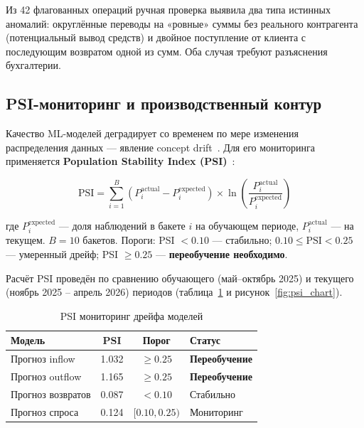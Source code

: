 Из 42 флагованных операций ручная проверка выявила два типа истинных аномалий: округлённые переводы на «ровные» суммы без реального контрагента (потенциальный вывод средств) и двойное поступление от клиента с последующим возвратом одной из сумм. Оба случая требуют разъяснения бухгалтерии.

\subsection{PSI-мониторинг и производственный контур}

Качество ML-моделей деградирует со временем по мере изменения распределения данных --- явление concept drift~\cite{widmer1996learning}. Для его мониторинга применяется \textbf{Population Stability Index (PSI)}~\cite{siddiqi2006credit}:

\begin{equation}
\text{PSI} = \sum_{i=1}^{B} \left( P_i^{\text{actual}} - P_i^{\text{expected}} \right) \times \ln\!\left( \frac{P_i^{\text{actual}}}{P_i^{\text{expected}}} \right)
\end{equation}

где $P_i^{\text{expected}}$ --- доля наблюдений в бакете $i$ на обучающем периоде, $P_i^{\text{actual}}$ --- на текущем. $B = 10$ бакетов. Пороги: PSI $< 0.10$ --- стабильно; $0.10 \le \text{PSI} < 0.25$ --- умеренный дрейф; PSI $\ge 0.25$ --- \textbf{переобучение необходимо}.

Расчёт PSI проведён по сравнению обучающего (май--октябрь 2025) и текущего (ноябрь 2025 -- апрель 2026) периодов (таблица~\ref{tab:psi_monitoring} и рисунок~\ref{fig:psi_chart}).

\begin{table}[H]
\centering
\caption{PSI мониторинг дрейфа моделей}
\label{tab:psi_monitoring}
\begin{tabular}{lccl}
\toprule
\textbf{Модель} & \textbf{PSI} & \textbf{Порог} & \textbf{Статус} \\
\midrule
Прогноз inflow & 1.032 & $\ge 0.25$ & \textbf{Переобучение} \\
Прогноз outflow & 1.165 & $\ge 0.25$ & \textbf{Переобучение} \\
Прогноз возвратов & 0.087 & $< 0.10$ & Стабильно \\
Прогноз спроса & 0.124 & $[0.10,0.25)$ & Мониторинг \\
\bottomrule
\end{tabular}
\end{table}

